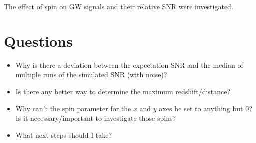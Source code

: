 \documentclass[10pt]{article}
\begin{document}
\begin{multicols*}{2}
The effect of spin on GW signals and their relative SNR were investigated. 





\section{Questions}

\begin{itemize}
    \item Why is there a deviation between the expectation SNR and the median of multiple runs of the simulated SNR (with noise)? 
    \item Is there any better way to determine the maximum redshift/distance?
    \item Why can't the spin parameter for the $x$ and $y$ axes be set to anything but 0? Is it necessary/important to investigate those spins? 
    \item What next steps should I take? 
\end{itemize}






\end{multicols*}
\end{document}
